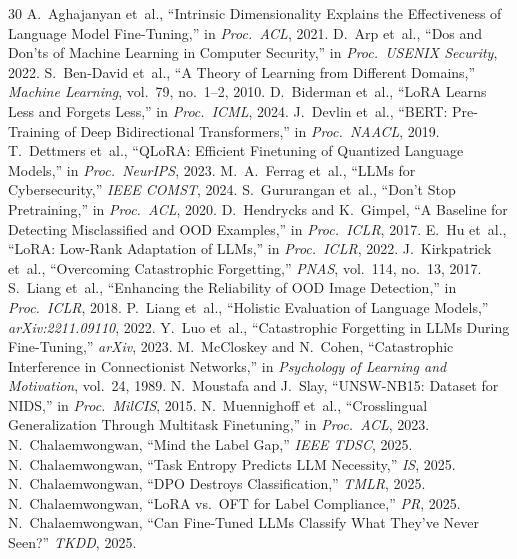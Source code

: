 \documentclass[journal]{IEEEtran}
\begin{document}
\begin{thebibliography}{30}
 A.~Aghajanyan et~al., ``Intrinsic Dimensionality Explains the Effectiveness of Language Model Fine-Tuning,'' in \emph{Proc.\ ACL}, 2021.
 D.~Arp et~al., ``Dos and Don'ts of Machine Learning in Computer Security,'' in \emph{Proc.\ USENIX Security}, 2022.
 S.~Ben-David et~al., ``A Theory of Learning from Different Domains,'' \emph{Machine Learning}, vol.~79, no.~1--2, 2010.
 D.~Biderman et~al., ``LoRA Learns Less and Forgets Less,'' in \emph{Proc.\ ICML}, 2024.
 J.~Devlin et~al., ``BERT: Pre-Training of Deep Bidirectional Transformers,'' in \emph{Proc.\ NAACL}, 2019.
 T.~Dettmers et~al., ``QLoRA: Efficient Finetuning of Quantized Language Models,'' in \emph{Proc.\ NeurIPS}, 2023.
 M.~A.~Ferrag et~al., ``LLMs for Cybersecurity,'' \emph{IEEE COMST}, 2024.
 S.~Gururangan et~al., ``Don't Stop Pretraining,'' in \emph{Proc.\ ACL}, 2020.
 D.~Hendrycks and K.~Gimpel, ``A Baseline for Detecting Misclassified and OOD Examples,'' in \emph{Proc.\ ICLR}, 2017.
 E.~Hu et~al., ``LoRA: Low-Rank Adaptation of LLMs,'' in \emph{Proc.\ ICLR}, 2022.
 J.~Kirkpatrick et~al., ``Overcoming Catastrophic Forgetting,'' \emph{PNAS}, vol.~114, no.~13, 2017.
 S.~Liang et~al., ``Enhancing the Reliability of OOD Image Detection,'' in \emph{Proc.\ ICLR}, 2018.
 P.~Liang et~al., ``Holistic Evaluation of Language Models,'' \emph{arXiv:2211.09110}, 2022.
 Y.~Luo et~al., ``Catastrophic Forgetting in LLMs During Fine-Tuning,'' \emph{arXiv}, 2023.
 M.~McCloskey and N.~Cohen, ``Catastrophic Interference in Connectionist Networks,'' in \emph{Psychology of Learning and Motivation}, vol.~24, 1989.
 N.~Moustafa and J.~Slay, ``UNSW-NB15: Dataset for NIDS,'' in \emph{Proc.\ MilCIS}, 2015.
 N.~Muennighoff et~al., ``Crosslingual Generalization Through Multitask Finetuning,'' in \emph{Proc.\ ACL}, 2023.
 N.~Chalaemwongwan, ``Mind the Label Gap,'' \emph{IEEE TDSC}, 2025.
 N.~Chalaemwongwan, ``Task Entropy Predicts LLM Necessity,'' \emph{IS}, 2025.
 N.~Chalaemwongwan, ``DPO Destroys Classification,'' \emph{TMLR}, 2025.
 N.~Chalaemwongwan, ``LoRA vs.\ OFT for Label Compliance,'' \emph{PR}, 2025.
 N.~Chalaemwongwan, ``Can Fine-Tuned LLMs Classify What They've Never Seen?'' \emph{TKDD}, 2025.

\end{thebibliography}
\end{document}
